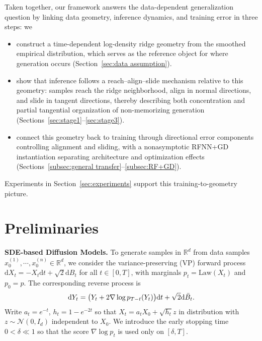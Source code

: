 \documentclass[11pt]{article}
\newcommand{\mb}{\mathbb}
\newcommand{\dee}{\mathrm{d}}
\newcommand{\mc}{\mathcal}
\begin{document}
Taken together, our framework answers the data-dependent generalization question by linking data geometry, inference dynamics, and training error in three steps: we
\begin{itemize}
\item[(1)] construct a time-dependent log-density ridge geometry from the smoothed empirical distribution, which serves as the reference object for where generation occurs (Section~\ref{sec:data assumption}).
\item[(2)] show that inference follows a reach--align--slide mechanism relative to this geometry: samples reach the ridge neighborhood, align in normal directions, and slide in tangent directions, thereby describing both concentration and partial tangential organization of non-memorizing generation (Sections~\ref{sec:stage1}--\ref{sec:stage3}).
\item[(3)] connect this geometry back to training through directional error components controlling alignment and sliding, with a nonasymptotic RFNN+GD instantiation separating architecture and optimization effects (Sections~\ref{subsec:general transfer}--\ref{subsec:RF+GD}).
\end{itemize}
Experiments in Section~\ref{sec:experiments} support this training-to-geometry picture.

\section{Preliminaries}\label{sec:prelim}

\noindent\textbf{SDE-based Diffusion Models.} To generate samples in $\mb{R}^d$ from data samples $x_0^{(1)},\cdots, x_0^{(n)}\in \mb{R}^d$, we consider the variance-preserving (VP) forward process $
    \dee X_t = -X_t \dee t +\sqrt{2}\dee B_t
$
for all $t\in [0,T]$, with marginals $p_t=\text{Law}(X_t)$ and $p_0=p$. The corresponding reverse process is
\begin{align}\label{eq:BD}
    \dee Y_t = \big( Y_t + 2\nabla\log p_{T-t} (Y_t) \big) \dee t +\sqrt{2}\dee \Bar{B}_t.
\end{align}
 Write $a_t=e^{-t}$, $h_t=1-e^{-2t}$ so that $X_t=a_t X_0+\sqrt{h_t}z$ in distribution with $z\sim \mc{N}(0,I_d)$ independent to $X_0$. We introduce the early stopping time $0<\delta\ll 1$ so that the score $\nabla\log p_t$ is used only on $[\delta,T]$.
\end{document}
